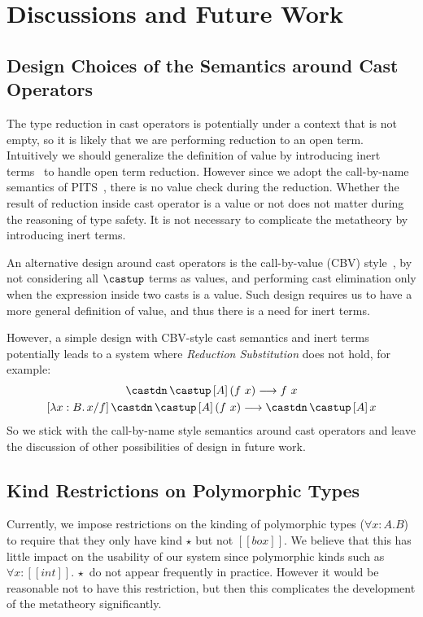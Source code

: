 \section{Discussions and Future Work}

\subsection{Design Choices of the Semantics around Cast Operators}
\label{sec:cast-design}

The type reduction in cast operators is potentially under a context that
is not empty, so it is likely that we are performing reduction to an open term.
Intuitively we should generalize the definition of value by introducing inert
terms~\cite{yang2017unifying} to handle open term reduction.
However since we adopt the call-by-name semantics of PITS~\cite{yang2019pure},
there is no value check during the reduction. Whether the result of reduction
inside cast operator is a value or not does not matter during the reasoning of
type safety. It is not necessary to complicate the metatheory by introducing inert terms.

An alternative design
around cast operators is the call-by-value (CBV) style~\cite{yang2019pure},
by not considering all $\castup$ terms as values, and performing cast elimination only
when the expression inside two casts is a value. Such design requires us to
have a more general definition of value, and thus there is a need for inert terms.

However, a simple design with CBV-style cast semantics and inert terms
potentially leads to a system where \emph{Reduction Substitution} does not hold,
for example:
\begin{gather*}
    \castdn \, \castup \, [A] \, (f ~ x) \longrightarrow f ~ x \\
    [\lambda x : B. \, x / f] \, \castdn \, \castup \, [A] \, (f ~ x) \longrightarrow \castdn \, \castup \, [A] \, x
\end{gather*}
So we stick with the call-by-name style semantics around cast operators and
leave the discussion of other possibilities of design in future work.

\subsection{Kind Restrictions on Polymorphic Types}

Currently, we impose restrictions on the kinding of polymorphic types
($\forall x : A. B$) to require that they only have kind $\star$ but not $[[box]]$.
We believe that this has little impact on the usability
of our system since polymorphic
kinds such as $\forall x : [[int]].\,\star$ do not appear frequently in practice.
However it would be reasonable not to have this restriction, but then
this complicates the development of the metatheory significantly.

